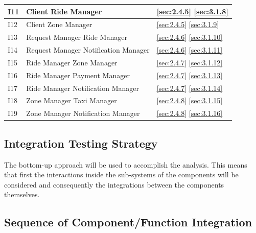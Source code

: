 \documentclass[a4paper,11pt]{report} %
\begin{document}
\begin{center}
\begin{tabular}{ l | p{7cm} | p{5cm} }
					 I11 & Client \textrightarrow Ride Manager & \ref{sec:2.4.5} \hspace{25pt} \ref{sec:3.1.8}\\\hline					 					 					 	
					 I12 & Client \textrightarrow Zone Manager & \ref{sec:2.4.5} \hspace{25pt} \ref{sec:3.1.9}\\\hline					 					 					 	
					 I13 & Request Manager \textrightarrow Ride Manager & \ref{sec:2.4.6} \hspace{25pt} \ref{sec:3.1.10}\\\hline		
					 I14 & Request Manager \textrightarrow Notification Manager & \ref{sec:2.4.6} \hspace{25pt} \ref{sec:3.1.11}\\\hline					 					 					 					
					 I15 & Ride Manager \textrightarrow Zone Manager & \ref{sec:2.4.7} \hspace{25pt} \ref{sec:3.1.12}\\\hline					 					 					 	
					 I16 & Ride Manager \textrightarrow Payment Manager & \ref{sec:2.4.7} \hspace{25pt} \ref{sec:3.1.13}\\\hline					 	 			 				
					 I17 & Ride Manager \textrightarrow Notification Manager & \ref{sec:2.4.7}  \hspace{25pt} \ref{sec:3.1.14}\\\hline					 					 					 		 					 	
					 I18 & Zone Manager \textrightarrow Taxi Manager & \ref{sec:2.4.8} \hspace{25pt} \ref{sec:3.1.15}\\\hline					 					 					 	
					 I19 & Zone Manager \textrightarrow Notification Manager & \ref{sec:2.4.8}  \hspace{25pt} \ref{sec:3.1.16}\\\hline
				\end{tabular}
			\end{center}			
	\subsection{Integration Testing Strategy}
		The bottom-up approach will be used to accomplish the analysis. This means that first the interactions inside the sub-systems of the components will be considered and consequently the integrations between the components themselves.
	\subsection{Sequence of Component/Function Integration}
\end{document}
